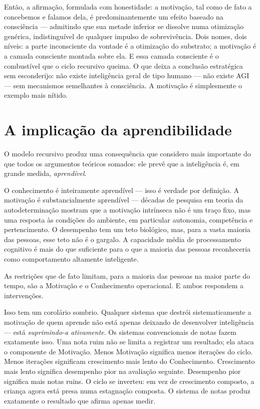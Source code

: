 \documentclass[11pt, twoside, openright]{book}
\begin{document}
Então, a afirmação, formulada com honestidade: a motivação, tal como de fato a concebemos e falamos dela, é predominantemente um efeito baseado na consciência --- admitindo que sua metade inferior se dissolve numa otimização genérica, indistinguível de qualquer impulso de sobrevivência. Dois nomes, dois níveis: a parte inconsciente da vontade é a otimização do substrato; a motivação é a camada consciente montada sobre ela. E essa camada consciente é o combustível que o ciclo recursivo queima. O que deixa a conclusão estratégica sem esconderijo: não existe inteligência geral de tipo humano --- não existe AGI --- sem mecanismos semelhantes à consciência. A motivação é simplesmente o exemplo mais nítido.

\section*{A implicação da aprendibilidade}

O modelo recursivo produz uma consequência que considero mais importante do que todos os argumentos teóricos somados: ele prevê que a inteligência é, em grande medida, \textit{aprendível}.

O conhecimento é inteiramente aprendível --- isso é verdade por definição. A motivação é substancialmente aprendível --- décadas de pesquisa em teoria da autodeterminação mostram que a motivação intrínseca não é um traço fixo, mas uma resposta às condições do ambiente, em particular autonomia, competência e pertencimento. O desempenho tem um teto biológico, mas, para a vasta maioria das pessoas, esse teto não é o gargalo. A capacidade média de processamento cognitivo é mais do que suficiente para o que a maioria das pessoas reconheceria como comportamento altamente inteligente.

As restrições que de fato limitam, para a maioria das pessoas na maior parte do tempo, são a Motivação e o Conhecimento operacional. E ambos respondem a intervenções.

Isso tem um corolário sombrio. Qualquer sistema que destrói sistematicamente a motivação de quem aprende não está apenas deixando de desenvolver inteligência --- está \textit{suprimindo-a ativamente}. Os sistemas convencionais de notas fazem exatamente isso. Uma nota ruim não se limita a registrar um resultado; ela ataca o componente de Motivação. Menos Motivação significa menos iterações do ciclo. Menos iterações significam crescimento mais lento do Conhecimento. Crescimento mais lento significa desempenho pior na avaliação seguinte. Desempenho pior significa mais notas ruins. O ciclo se inverteu: em vez de crescimento composto, a criança agora está presa numa estagnação composta. O sistema de notas produz exatamente o resultado que afirma apenas medir.
\end{document}
